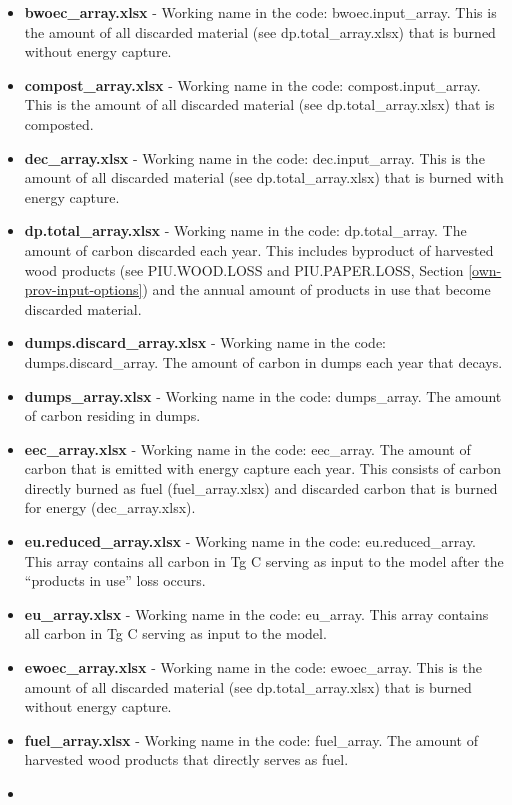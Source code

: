 \documentclass[
  openany]{book}
\begin{document}
\begin{itemize}
\item
  \textbf{bwoec\_array.xlsx} - Working name in the code: bwoec.input\_array. This is the amount of all discarded material (see dp.total\_array.xlsx) that is burned without energy capture.
\item
  \textbf{compost\_array.xlsx} - Working name in the code: compost.input\_array. This is the amount of all discarded material (see dp.total\_array.xlsx) that is composted.
\item
  \textbf{dec\_array.xlsx} - Working name in the code: dec.input\_array. This is the amount of all discarded material (see dp.total\_array.xlsx) that is burned with energy capture.
\item
  \textbf{dp.total\_array.xlsx} - Working name in the code: dp.total\_array. The amount of carbon discarded each year. This includes byproduct of harvested wood products (see PIU.WOOD.LOSS and PIU.PAPER.LOSS, Section \ref{own-prov-input-options}) and the annual amount of products in use that become discarded material.
\item
  \textbf{dumps.discard\_array.xlsx} - Working name in the code: dumps.discard\_array. The amount of carbon in dumps each year that decays.
\item
  \textbf{dumps\_array.xlsx} - Working name in the code: dumps\_array. The amount of carbon residing in dumps.
\item
  \textbf{eec\_array.xlsx} - Working name in the code: eec\_array. The amount of carbon that is emitted with energy capture each year. This consists of carbon directly burned as fuel (fuel\_array.xlsx) and discarded carbon that is burned for energy (dec\_array.xlsx).
\item
  \textbf{eu.reduced\_array.xlsx} - Working name in the code: eu.reduced\_array. This array contains all carbon in Tg C serving as input to the model after the ``products in use'' loss occurs.
\item
  \textbf{eu\_array.xlsx} - Working name in the code: eu\_array. This array contains all carbon in Tg C serving as input to the model.
\item
  \textbf{ewoec\_array.xlsx} - Working name in the code: ewoec\_array. This is the amount of all discarded material (see dp.total\_array.xlsx) that is burned without energy capture.
\item
  \textbf{fuel\_array.xlsx} - Working name in the code: fuel\_array. The amount of harvested wood products that directly serves as fuel.
\item

\end{itemize}
\end{document}
